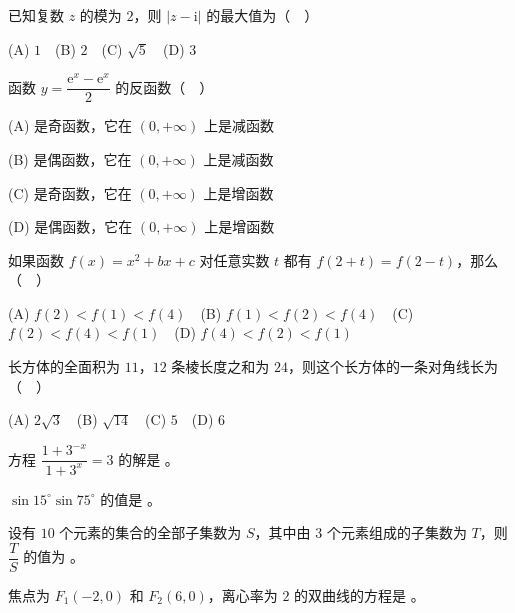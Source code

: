 \begin{question}
已知复数 \(z\) 的模为 \(2\)，则 \(|z-\mathrm{i}|\) 的最大值为（　）

(A) \(1\)　(B) \(2\)　(C) \(\sqrt{5}\)　(D) \(3\)

\end{question}
\begin{question}
函数 \(y=\dfrac{\mathrm{e}^{x}-\mathrm{e}^{x}}{2}\) 的反函数（　）

(A) 是奇函数，它在 \((0,+\infty)\) 上是减函数

(B) 是偶函数，它在 \((0,+\infty)\) 上是减函数

(C) 是奇函数，它在 \((0,+\infty)\) 上是增函数

(D) 是偶函数，它在 \((0,+\infty)\) 上是增函数

\end{question}
\begin{question}
如果函数 \(f(x)=x^{2}+bx+c\) 对任意实数 \(t\) 都有 \(f(2+t)=f(2-t)\)，那么（　）

(A) \(f(2)<f(1)<f(4)\)　(B) \(f(1)<f(2)<f(4)\)　(C) \(f(2)<f(4)<f(1)\)　(D) \(f(4)<f(2)<f(1)\)

\end{question}
\begin{question}
长方体的全面积为 \(11\)，\(12\) 条棱长度之和为 \(24\)，则这个长方体的一条对角线长为（　）

(A) \(2\sqrt{3}\)　(B) \(\sqrt{14}\)　(C) \(5\)　(D) \(6\)

\end{question}
\begin{question}
方程 \(\dfrac{1+3^{-x}}{1+3^{x}}=3\) 的解是 \underline{\qquad}。

\end{question}
\begin{question}
\(\sin 15^{\circ}\sin 75^{\circ}\) 的值是 \underline{\qquad}。

\end{question}
\begin{question}
设有 \(10\) 个元素的集合的全部子集数为 \(S\)，其中由 \(3\) 个元素组成的子集数为 \(T\)，则 \(\dfrac{T}{S}\) 的值为 \underline{\qquad}。

\end{question}
\begin{question}
焦点为 \(F_1(-2,0)\) 和 \(F_2(6,0)\)，离心率为 \(2\) 的双曲线的方程是 \underline{\qquad}。

\end{question}
